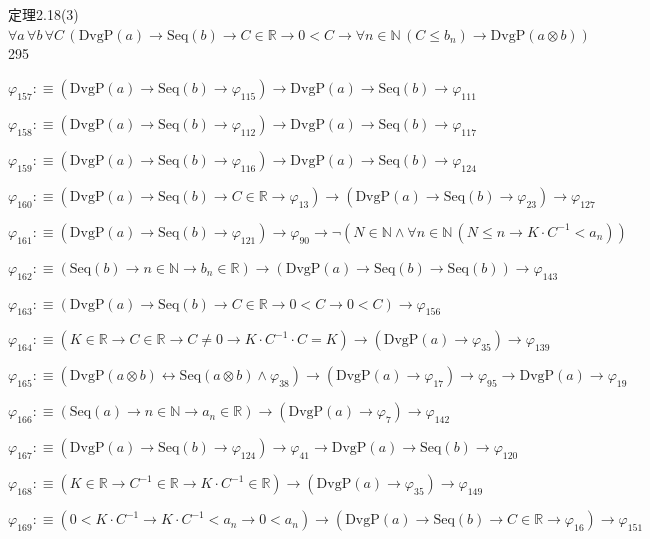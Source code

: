 \begin{fullproof}{定理2.18(3)}{$\forall a\,\forall b\,\forall C\,(\mathrm{DvgP}(a) \to \mathrm{Seq}(b) \to C \in \mathbb{R} \to 0 < C \to \forall n \in \mathbb{N}\,(C \leq b_{n}) \to \mathrm{DvgP}(a \otimes b))$}{295}
\begin{abbrevlist}
\item $\varphi_{157} :\equiv (\mathrm{DvgP}(a) \to \mathrm{Seq}(b) \to \varphi_{115}) \to \mathrm{DvgP}(a) \to \mathrm{Seq}(b) \to \varphi_{111}$
\item $\varphi_{158} :\equiv (\mathrm{DvgP}(a) \to \mathrm{Seq}(b) \to \varphi_{112}) \to \mathrm{DvgP}(a) \to \mathrm{Seq}(b) \to \varphi_{117}$
\item $\varphi_{159} :\equiv (\mathrm{DvgP}(a) \to \mathrm{Seq}(b) \to \varphi_{116}) \to \mathrm{DvgP}(a) \to \mathrm{Seq}(b) \to \varphi_{124}$
\item $\varphi_{160} :\equiv (\mathrm{DvgP}(a) \to \mathrm{Seq}(b) \to C \in \mathbb{R} \to \varphi_{13}) \to (\mathrm{DvgP}(a) \to \mathrm{Seq}(b) \to \varphi_{23}) \to \varphi_{127}$
\item $\varphi_{161} :\equiv (\mathrm{DvgP}(a) \to \mathrm{Seq}(b) \to \varphi_{121}) \to \varphi_{90} \to \neg (N \in \mathbb{N} \land \forall n \in \mathbb{N}\,(N \leq n \to K \cdot C^{-1} < a_{n}))$
\item $\varphi_{162} :\equiv (\mathrm{Seq}(b) \to n \in \mathbb{N} \to b_{n} \in \mathbb{R}) \to (\mathrm{DvgP}(a) \to \mathrm{Seq}(b) \to \mathrm{Seq}(b)) \to \varphi_{143}$
\item $\varphi_{163} :\equiv (\mathrm{DvgP}(a) \to \mathrm{Seq}(b) \to C \in \mathbb{R} \to 0 < C \to 0 < C) \to \varphi_{156}$
\item $\varphi_{164} :\equiv (K \in \mathbb{R} \to C \in \mathbb{R} \to C \neq 0 \to K \cdot C^{-1} \cdot C = K) \to (\mathrm{DvgP}(a) \to \varphi_{35}) \to \varphi_{139}$
\item $\varphi_{165} :\equiv (\mathrm{DvgP}(a \otimes b) \leftrightarrow \mathrm{Seq}(a \otimes b) \land \varphi_{38}) \to (\mathrm{DvgP}(a) \to \varphi_{17}) \to \varphi_{95} \to \mathrm{DvgP}(a) \to \varphi_{19}$
\item $\varphi_{166} :\equiv (\mathrm{Seq}(a) \to n \in \mathbb{N} \to a_{n} \in \mathbb{R}) \to (\mathrm{DvgP}(a) \to \varphi_{7}) \to \varphi_{142}$
\item $\varphi_{167} :\equiv (\mathrm{DvgP}(a) \to \mathrm{Seq}(b) \to \varphi_{124}) \to \varphi_{41} \to \mathrm{DvgP}(a) \to \mathrm{Seq}(b) \to \varphi_{120}$
\item $\varphi_{168} :\equiv (K \in \mathbb{R} \to C^{-1} \in \mathbb{R} \to K \cdot C^{-1} \in \mathbb{R}) \to (\mathrm{DvgP}(a) \to \varphi_{35}) \to \varphi_{149}$
\item $\varphi_{169} :\equiv (0 < K \cdot C^{-1} \to K \cdot C^{-1} < a_{n} \to 0 < a_{n}) \to (\mathrm{DvgP}(a) \to \mathrm{Seq}(b) \to C \in \mathbb{R} \to \varphi_{16}) \to \varphi_{151}$

\end{abbrevlist}
\end{fullproof}
